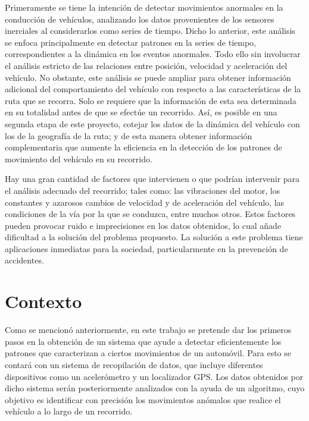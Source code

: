 Primeramente se tiene la intención de detectar movimientos anormales en la conducción de vehículos, analizando los datos provenientes de los sensores inerciales al considerarlos como series de tiempo.
Dicho lo anterior, este análisis se enfoca principalmente en detectar patrones en la series de tiempo, correspondientes a la dinámica en los eventos anormales.%
Todo ello sin involucrar el análisis estricto de las relaciones entre posición, velocidad y aceleración del vehículo.
No obstante, este análisis se puede ampliar para obtener información adicional del comportamiento del vehículo con respecto a las características de la ruta que se recorra. 
Solo se requiere que la información de esta sea determinada en su totalidad antes de que se efectúe un recorrido.
Así, es posible en una segunda etapa de este proyecto, cotejar los datos de la dinámica del vehículo con los de la geografía de la ruta; y de esta manera obtener información complementaria que aumente la eficiencia en la detección de los patrones de movimiento del vehículo en su recorrido.

Hay una gran cantidad de factores que intervienen o que podrían intervenir para el análisis adecuado del recorrido; tales como: las vibraciones del motor, los constantes y azarosos cambios de velocidad y de aceleración del vehículo, las condiciones de la vía por la que se conduzca, entre muchos otros.
Estos factores pueden provocar ruido e imprecisiones en los datos obtenidos, lo cual añade dificultad a la solución del problema propuesto. La solución a este problema tiene aplicaciones inmediatas para la sociedad, particularmente en la prevención de accidentes.

\section{Contexto}
Como se mencionó anteriormente, en este trabajo se pretende dar los primeros pasos en la obtención de un sistema que ayude a detectar eficientemente los patrones que caracterizan a ciertos movimientos de un automóvil. 
Para esto se contará con un sistema de recopilación de datos, que incluye diferentes dispositivos como un acelerómetro y un localizador GPS. 
Los datos obtenidos por dicho sistema serán posteriormente analizados con la ayuda de un algoritmo, cuyo objetivo es identificar con precisión los movimientos anómalos que realice el vehículo a lo largo de un recorrido.
 
